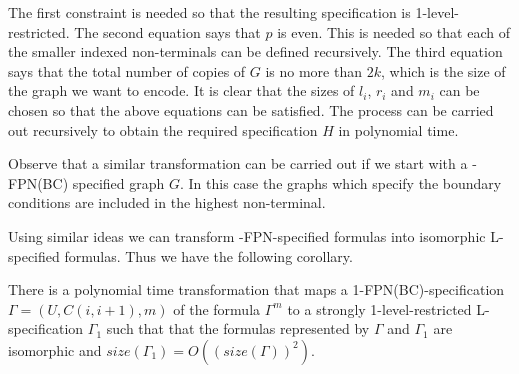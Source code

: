 The first constraint is needed so that the resulting specification is 
1-level-restricted. The second equation says that $p$ is even. This is needed 
so that each of the smaller indexed non-terminals  
can be defined recursively. 
The third equation says that the 
total number of copies of $G$ is no more than $2k$, which is the size of the
graph we want to encode. It is clear that the sizes of $l_i$, 
$r_i$ and $m_i$ can be chosen  so that the above equations can be satisfied.
The process can be
carried out recursively to obtain the required specification $H$
in polynomial time.

Observe that a similar transformation can be carried out if we start
with a {-FPN(BC)} specified graph $G$. 
In this case the graphs which specify the boundary conditions
are included in the highest non-terminal.\QED

Using similar ideas we can transform {-FPN}-specified formulas into
isomorphic {\sf L}-specified formulas. Thus we have the following corollary.


\begin{corollary}\label{cor:translate}
There is a polynomial time transformation that maps a 
1-FPN(BC)-specification $\Gamma = (U, C(i, i+1), m)$ of the formula $\Gamma^m$ 
to a strongly 1-level-restricted 
L-specification $\Gamma_1$ such that
that the formulas represented by $\Gamma$ and $\Gamma_1$ are isomorphic and
$size(\Gamma_1)= O((size(\Gamma))^2)$.
\end{corollary}
